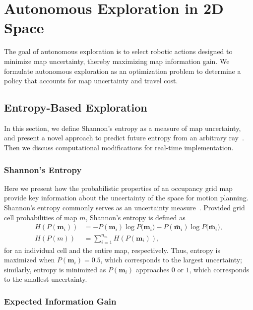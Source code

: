 
\chapter{Autonomous Exploration in 2D Space} \label{chap:ae2D}

The goal of autonomous exploration is to select robotic actions designed to minimize map uncertainty, thereby maximizing map information gain. We formulate autonomous exploration as an optimization problem to determine a policy that accounts for map uncertainty and travel cost.

\section{Entropy-Based Exploration}

In this section, we define Shannon's entropy as a measure of map uncertainty, and present a novel approach to predict future entropy from an arbitrary ray~\cite{KauAiLee16}. Then we discuss computational modifications for real-time implementation.

\subsection{Shannon's Entropy}

Here we present how the probabilistic properties of an occupancy grid map provide key information about the uncertainty of the space for motion planning. Shannon's entropy commonly serves as an uncertainty measure~\cite{StaGriBur05}. Provided grid cell probabilities of map $ m$, Shannon's entropy is defined as
\begin{align}
\label{eqn:ShannonsEntropyCell}
H(P(\mathbf{m}_i))&=-P(\mathbf{m}_i)\log{P(\mathbf{m}_i})-P(\bar{\mathbf{m}}_i)\log{P(\bar{\mathbf{m}}_i}),
\\
\label{eqn:ShannonsEntropyMap}
H(P(m))&=\sum_{i=1}^{n_m}H(P(\mathbf{m}_i)),
\end{align}
for an individual cell and the entire map, respectively.
Thus, entropy is maximized when $P(\mathbf{m}_i)=0.5$, which corresponds to the largest uncertainty; similarly, entropy is minimized as $P(\mathbf{m}_i)$ approaches $0$ or $1$, which corresponds to the smallest uncertainty. %



\subsection{Expected Information Gain}

